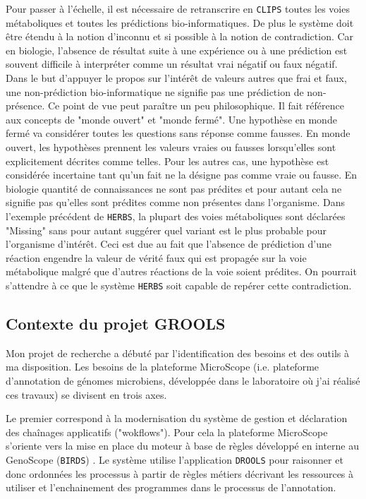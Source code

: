 \begin{refsegment}
Pour passer à l'échelle, il est nécessaire de retranscrire  en \texttt{\gls{CLIPS}}  toutes les voies métaboliques et toutes les prédictions bio-informatiques. De plus le système doit être étendu à la notion d'inconnu et si possible à la notion de contradiction. Car en biologie, l’absence de résultat suite à une expérience ou à une prédiction est souvent difficile à interpréter comme un résultat vrai négatif ou faux négatif.  Dans le but d'appuyer le propos sur l'intérêt de valeurs autres que frai et faux, une non-prédiction bio-informatique ne signifie pas une prédiction de non-présence. Ce point de vue peut paraître un peu philosophique. Il fait référence aux concepts de "monde ouvert" et "monde fermé". Une hypothèse en monde fermé va considérer toutes les questions sans réponse comme fausses. En monde ouvert, les hypothèses prennent les valeurs vraies ou fausses lorsqu'elles sont explicitement décrites comme telles. Pour les autres cas, une hypothèse est considérée incertaine tant qu'un fait ne la désigne pas comme vraie ou fausse. En biologie quantité de connaissances ne sont pas prédites et pour autant cela ne signifie pas qu'elles sont prédites comme non présentes dans l'organisme. Dans l’exemple précédent de \texttt{\gls{HERBS}}, la plupart des voies métaboliques sont déclarées "Missing" sans pour autant suggérer quel variant est le plus probable pour l'organisme d'intérêt. Ceci est due au fait que l’absence de prédiction d’une réaction engendre la valeur de vérité faux qui est propagée sur la voie métabolique malgré que d’autres réactions de la voie soient prédites. On pourrait s’attendre à ce que le système \texttt{\gls{HERBS}} soit capable de repérer cette contradiction.

\subsection{Contexte du projet GROOLS}

Mon projet de recherche a débuté par l'identification des besoins et des outils à ma disposition. Les besoins de la plateforme MicroScope (i.e. plateforme d’annotation de génomes microbiens, développée dans le laboratoire où j’ai réalisé ces travaux) se divisent en trois axes.

Le premier  correspond à la modernisation du système de gestion et déclaration des chaînages applicatifs ("wokflows"). Pour cela la plateforme MicroScope s'oriente vers la mise en place du moteur à base de règles développé en interne au GenoScope (\texttt{\gls{BIRDS}}) . Le système utilise l'application \texttt{DROOLS}\cite{mcwhirter2001drools,browne2009jboss} pour raisonner et donc ordonnées les processus à partir de règles métiers décrivant les ressources à utiliser et l’enchainement des programmes dans le processus de l'annotation.


\end{refsegment}
